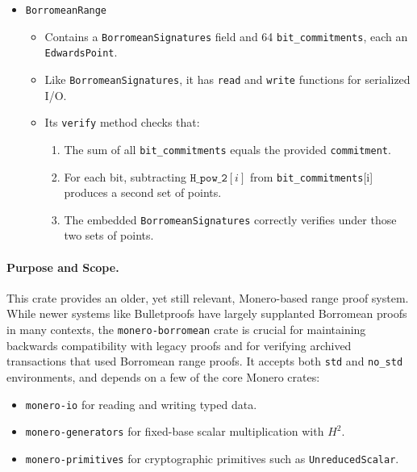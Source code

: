 \begin{itemize}
  \item \texttt{BorromeanRange} %
  \begin{itemize}
    \item Contains a \texttt{BorromeanSignatures} field and 64 \texttt{bit\_commitments}, each an \texttt{EdwardsPoint}.
    \item Like \texttt{BorromeanSignatures}, it has \texttt{read} and \texttt{write} functions for serialized I/O. %
    \item Its \texttt{verify} method checks that: %
      \begin{enumerate}[label=(\alph*)]
        \item The sum of all \texttt{bit\_commitments} equals the provided \texttt{commitment}. %
        \item For each bit, subtracting \(\texttt{H\_pow\_2}[i]\) from \texttt{bit\_commitments}[i] produces a second set of points. %
        \item The embedded \texttt{BorromeanSignatures} correctly verifies under those two sets of points. %
      \end{enumerate}
  \end{itemize}
\end{itemize}

\paragraph{Purpose and Scope.} 
This crate provides an older, yet still relevant, Monero-based range proof system.  While newer systems like Bulletproofs have largely supplanted Borromean proofs in many contexts, the \texttt{monero-borromean} crate is crucial for maintaining backwards compatibility with legacy proofs and for verifying archived transactions that used Borromean range proofs. It accepts both \texttt{std} and \texttt{no\_std} environments, and depends on a few of the core Monero crates:
\begin{itemize}
  \item \texttt{monero-io} for reading and writing typed data.
  \item \texttt{monero-generators} for fixed-base scalar multiplication with \(H^2\).
  \item \texttt{monero-primitives} for cryptographic primitives such as \texttt{UnreducedScalar}.
\end{itemize}

